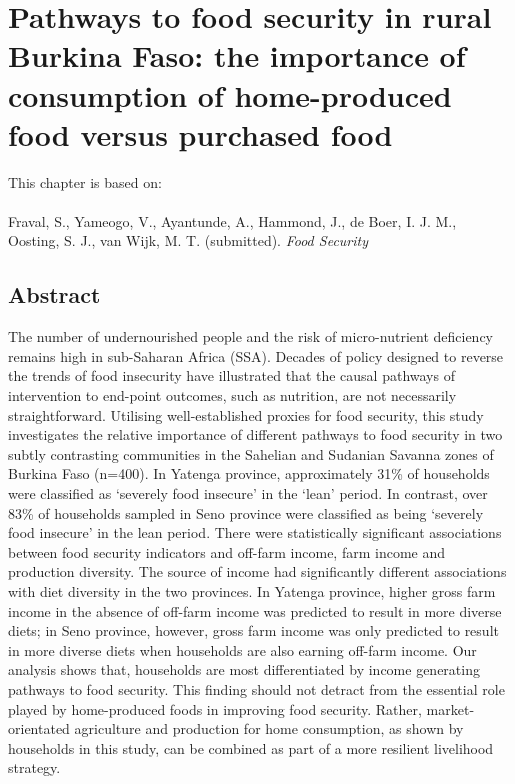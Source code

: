 \chapter[Pathways to food security in rural Burkina Faso: the importance of consumption of home-produced food versus purchased food]{Pathways to food security in rural Burkina Faso: the importance of consumption of home-produced food versus purchased food} %
\label{cha:chapter5}
\vspace*{\fill}
This chapter is based on:
\\
\\

Fraval, S., Yameogo, V., Ayantunde, A., Hammond, J., de Boer, I. J. M., Oosting, S. J., van Wijk, M. T. (submitted). \textit{Food Security}


\newpage

\section*{Abstract}
The number of undernourished people and the risk of micro-nutrient deficiency remains high in sub-Saharan Africa (SSA). Decades of policy designed to reverse the trends of food insecurity have illustrated that the causal pathways of intervention to end-point outcomes, such as nutrition, are not necessarily straightforward. Utilising well-established proxies for food security, this study investigates the relative importance of different pathways to food security in two subtly contrasting communities in the Sahelian and Sudanian Savanna zones of Burkina Faso (n=400). In Yatenga province, approximately 31\% of households were classified as `severely food insecure' in the `lean' period. In contrast, over 83\% of households sampled in Seno province were classified as being `severely food insecure' in the lean period. There were statistically significant associations between food security indicators and off-farm income, farm income and production diversity. The source of income had significantly different associations with diet diversity in the two provinces. In Yatenga province, higher gross farm income in the absence of off-farm income was predicted to result in more diverse diets; in Seno province, however, gross farm income was only predicted to result in more diverse diets when households are also earning off-farm income. Our analysis shows that, households are most differentiated by income generating pathways to food security. This finding should not detract from the essential role played by home-produced foods in improving food security. Rather, market-orientated agriculture and production for home consumption, as shown by households in this study, can be combined as part of a more resilient livelihood strategy.

